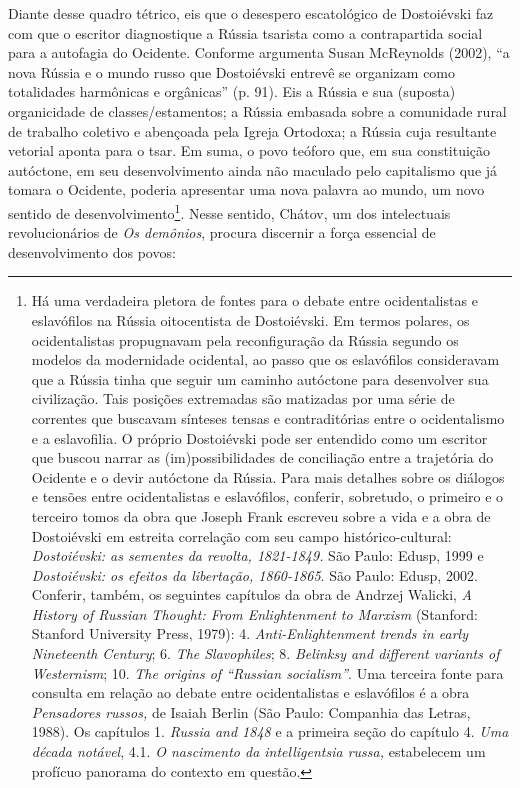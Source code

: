 Diante desse quadro tétrico, eis que o desespero escatológico de
Dostoiévski faz com que o escritor diagnostique a Rússia tsarista como a
contrapartida social para a autofagia do Ocidente. Conforme argumenta
Susan McReynolds (2002), ``a nova Rússia e o mundo russo que Dostoiévski
entrevê se organizam como totalidades harmônicas e orgânicas'' (p. 91).
Eis a Rússia e sua (suposta) organicidade de classes/estamentos; a
Rússia embasada sobre a comunidade rural de trabalho coletivo e
abençoada pela Igreja Ortodoxa; a Rússia cuja resultante vetorial aponta
para o tsar. Em suma, o povo teóforo que, em sua constituição autóctone,
em seu desenvolvimento ainda não maculado pelo capitalismo que já tomara
o Ocidente, poderia apresentar uma nova palavra ao mundo, um novo
sentido de desenvolvimento\footnote{Há uma verdadeira pletora de fontes
  para o debate entre ocidentalistas e eslavófilos na Rússia
  oitocentista de Dostoiévski. Em termos polares, os ocidentalistas
  propugnavam pela reconfiguração da Rússia segundo os modelos da
  modernidade ocidental, ao passo que os eslavófilos consideravam que a
  Rússia tinha que seguir um caminho autóctone para desenvolver sua
  civilização. Tais posições extremadas são matizadas por uma série de
  correntes que buscavam sínteses tensas e contraditórias entre o
  ocidentalismo e a eslavofilia. O próprio Dostoiévski pode ser
  entendido como um escritor que buscou narrar as (im)possibilidades de
  conciliação entre a trajetória do Ocidente e o devir autóctone da
  Rússia. Para mais detalhes sobre os diálogos e tensões entre
  ocidentalistas e eslavófilos, conferir, sobretudo, o primeiro e o
  terceiro tomos da obra que Joseph Frank escreveu sobre a vida e a obra
  de Dostoiévski em estreita correlação com seu campo
  histórico-cultural: \emph{Dostoiévski: as sementes da revolta,
  1821-1849.} São Paulo: Edusp, 1999 e \emph{Dostoiévski: os efeitos da
  libertação, 1860-1865}. São Paulo: Edusp, 2002. Conferir, também, os
  seguintes capítulos da obra de Andrzej Walicki, \emph{A History of
  Russian Thought: From Enlightenment to Marxism} (Stanford: Stanford
  University Press, 1979): 4. \emph{Anti-Enlightenment trends in early
  Nineteenth Century}; 6. \emph{The Slavophiles}; 8. \emph{Belinksy and
  different variants of Westernism}; 10. \emph{The origins of ``Russian
  socialism''}. Uma terceira fonte para consulta em relação ao debate
  entre ocidentalistas e eslavófilos é a obra \emph{Pensadores russos,}
  de Isaiah Berlin (São Paulo: Companhia das Letras, 1988). Os capítulos
  1. \emph{Russia and 1848} e a primeira seção do capítulo 4. \emph{Uma
  década notável}, 4.1. \emph{O nascimento da intelligentsia russa,}
  estabelecem um profícuo panorama do contexto em questão.}. Nesse
sentido, Chátov, um dos intelectuais revolucionários de \emph{Os
demônios}, procura discernir a força essencial de desenvolvimento dos
povos:

